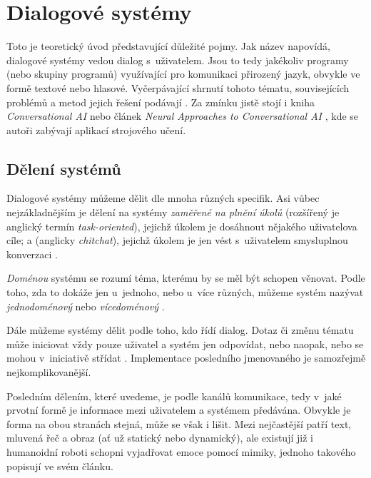 
\chapter{Dialogové systémy}\label{chapter-theory}

Toto je teoretický úvod představující důležité pojmy.
Jak název napovídá, dialogové systémy vedou dialog s~uživatelem. Jsou to
tedy jakékoliv programy (nebo skupiny programů) využívající
pro komunikaci přirozený jazyk, obvykle ve formě textové nebo hlasové.
Vyčerpávající shrnutí tohoto tématu, souvisejících problémů a metod
jejich řešení podávají \citet{jurafsky_slp_2020}. Za zmínku jistě stojí
i kniha \textit{Conversational AI} \citep{mctear_conversational_2020} nebo
článek \textit{Neural Approaches to Conversational AI} \citep{gao_neural_2019},
kde se autoři zabývají aplikací strojového učení.

\section{Dělení systémů}
Dialogové systémy můžeme dělit dle mnoha různých specifik. Asi vůbec
nejzákladnějším je dělení na systémy \textit{zaměřené na plnění úkolů}
(rozšířený je anglický termín \textit{task-oriented}), jejichž úkolem
je dosáhnout nějakého uživatelova cíle; a  (anglicky
\textit{chitchat}), jejichž úkolem je jen vést s~uživatelem smysluplnou
konverzaci \citep[strana 6]{gao_neural_2019}.

\textit{Doménou} systému se rozumí téma, kterému by se měl být schopen
věnovat. Podle toho, zda to dokáže jen u~jednoho, nebo u~více různých,
můžeme systém nazývat \textit{jednodoménový} nebo \textit{vícedoménový} \citep[strana 47]{gao_neural_2019}.

Dále můžeme systémy dělit podle toho, kdo řídí dialog. Dotaz či změnu tématu
může iniciovat vždy pouze uživatel a systém jen odpovídat, nebo naopak, nebo
se mohou v~iniciativě střídat \citep[strany 495-496]{jurafsky_slp_2020}. Implementace posledního jmenovaného je samozřejmě
nejkomplikovanější.

Posledním dělením, které uvedeme, je podle kanálů komunikace, tedy
v~jaké prvotní formě je informace mezi uživatelem a systémem předávána.
Obvykle je forma na obou stranách stejná, může se však i lišit. Mezi
nejčastější patří text, mluvená řeč a obraz (ať už statický nebo
dynamický), ale existují již i humanoidní roboti schopni vyjadřovat emoce pomocí
mimiky, jednoho takového popisují \citet{faraj_facially_2021} ve svém článku.

